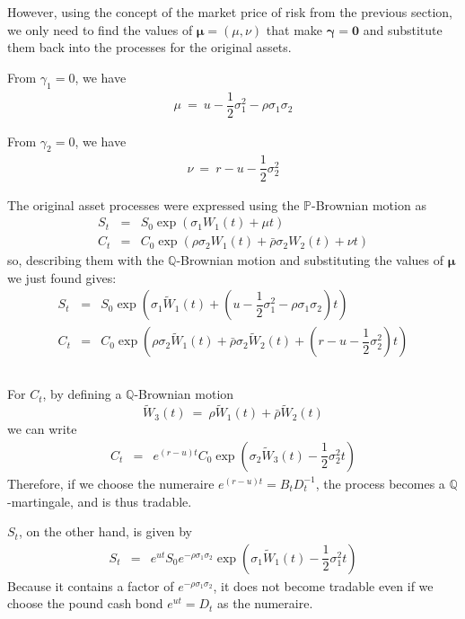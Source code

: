 \documentclass[uplatex,a4j,12pt,dvipdfmx]{jsarticle}
\begin{document}
However, using the concept of the market price of risk from the previous section, we only need to find the values of ${\bm \mu} = (\mu,\nu)$ that make ${\bm \gamma} = {\bm 0}$ and substitute them back into the processes for the original assets.

From $\gamma_{1} = 0$, we have
%
%
\begin{eqnarray}
	\mu
	\ = \
	u - \dfrac{1}{2} \sigma_{1}^{2} - \rho \sigma_{1} \sigma_{2}
\end{eqnarray}
%
%

From $\gamma_{2} = 0$, we have
%
%
\begin{eqnarray}
	\nu
	\ = \
	r - u - \dfrac{1}{2} \sigma_{2}^{2}
\end{eqnarray}
%
%

The original asset processes were expressed using the $\mathbb{P}$-Brownian motion as
%
%
\begin{eqnarray}
	S_{t}
	&=&
	S_{0}
	\exp \left( \sigma_{1} W_{1}(t) + \mu t \right)
	\\
	C_{t}
	&=&
	C_{0}
	\exp \left(
	\rho \sigma_{2} W_{1}(t) +
	\bar{\rho} \sigma_{2} W_{2}(t) + \nu t \right)
\end{eqnarray}
%
%
so, describing them with the $\mathbb{Q}$-Brownian motion and substituting the values of ${\bm \mu}$ we just found gives:
%
%
\begin{eqnarray}
	S_{t}
	&=&
	S_{0}
	\exp \left( \sigma_{1} \tilde{W}_{1}(t) +
	\left(
		u - \dfrac{1}{2} \sigma_{1}^{2} - \rho \sigma_{1} \sigma_{2}
		\right)
	t \right)
	\\
	C_{t}
	&=&
	C_{0}
	\exp \left(
	\rho \sigma_{2} \tilde{W}_{1}(t) +
	\bar{\rho} \sigma_{2} \tilde{W}_{2}(t) +
	\left(
		r - u - \dfrac{1}{2} \sigma_{2}^{2}
		\right)
	t \right)
\end{eqnarray}
%
%

${}$

For $C_{t}$,
by defining a $\mathbb{Q}$-Brownian motion
$$
	\tilde{W}_{3}(t)
	\ = \
	\rho \tilde{W}_{1}(t) +
	\bar{\rho} \tilde{W}_{2}(t)
$$
we can write
%
%
\begin{eqnarray}
	C_{t}
	&=&
	e^{(r-u)t}
	C_{0}
	\exp \left(
	\sigma_{2} \tilde{W}_{3}(t) -
	\dfrac{1}{2} \sigma_{2}^{2}
	t \right)
\end{eqnarray}
%
%
Therefore, if we choose the numeraire $e^{(r-u)t} = B_{t} D^{-1}_{t}$,
the process becomes a $\mathbb{Q}$-martingale, and is thus tradable.

$S_{t}$, on the other hand, is given by
%
%
\begin{eqnarray}
	S_{t}
	&=&
	e^{ut}
	S_{0}
	e^{- \rho \sigma_{1} \sigma_{2}}
	\exp \left( \sigma_{1} \tilde{W}_{1}(t) -
	\dfrac{1}{2} \sigma_{1}^{2}
	t \right)
\end{eqnarray}
%
%
Because it contains a factor of
$e^{- \rho \sigma_{1} \sigma_{2}}$,
it does not become tradable even if we choose the pound cash bond $e^{ut} = D_{t}$ as the numeraire.
\end{document}
